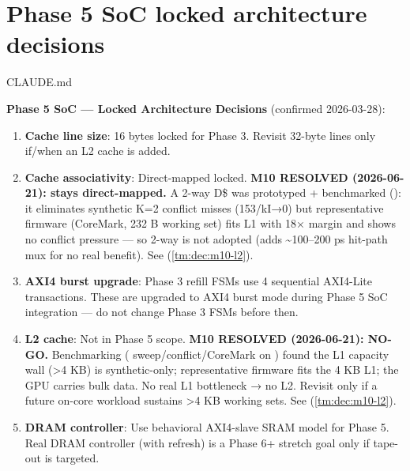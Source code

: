 \chapter{Phase 5 SoC locked architecture decisions}\label{ds:dec:locked-phase5}
\begin{relocated}{CLAUDE.md}

\textbf{Phase 5 SoC --- Locked Architecture Decisions} (confirmed
2026-03-28):

\begin{enumerate}
\def\labelenumi{\arabic{enumi}.}
\tightlist
\item
  \textbf{Cache line size}: 16 bytes locked for Phase 3. Revisit 32-byte
  lines only if/when an L2 cache is added.
\item
  \textbf{Cache associativity}: Direct-mapped locked. \textbf{M10
  RESOLVED (2026-06-21): stays direct-mapped.} A 2-way D\$ was
  prototyped + benchmarked (): it
  eliminates synthetic K=2 conflict misses (153/\allowbreak{}kI→0) but
  representative firmware (CoreMark, 232 B working set) fits L1 with 18×
  margin and shows no conflict pressure --- so 2-way is not adopted
  (adds \textasciitilde100--200 ps hit-path mux for no real benefit).
  See  (\cref{tm:dec:m10-l2}).
\item
  \textbf{AXI4 burst upgrade}: Phase 3 refill FSMs use 4 sequential
  AXI4-Lite transactions. These are upgraded to AXI4 burst mode during
  Phase 5 SoC integration --- do not change Phase 3 FSMs before then.
\item
  \textbf{L2 cache}: Not in Phase 5 scope. \textbf{M10 RESOLVED
  (2026-06-21): NO-GO.} Benchmarking (
  sweep/\allowbreak{}conflict/\allowbreak{}CoreMark on )
  found the L1 capacity wall (\textgreater4 KB) is synthetic-only;
  representative firmware fits the 4 KB L1; the GPU carries bulk data.
  No real L1 bottleneck → no L2. Revisit only if a future on-core
  workload sustains \textgreater4 KB working sets. See
   (\cref{tm:dec:m10-l2}).
\item
  \textbf{DRAM controller}: Use behavioral AXI4-slave SRAM model for
  Phase 5. Real DRAM controller (with refresh) is a Phase 6+ stretch
  goal only if tape-out is targeted.
\end{enumerate}
\end{relocated}


